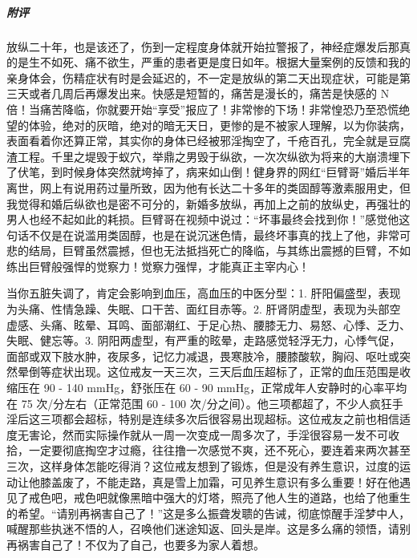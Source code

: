 \begin{case}
    \subparagraph{附评} 放纵二十年，也是该还了，伤到一定程度身体就开始拉警报了，神经症爆发后那真的是生不如死、痛不欲生，严重的患者更是度日如年。根据大量案例的反馈和我的亲身体会，伤精症状有时是会延迟的，不一定是放纵的第二天出现症状，可能是第三天或者几周后再爆发出来。快感是短暂的，痛苦是漫长的，痛苦是快感的 N 倍！当痛苦降临，你就要开始“享受”报应了！非常惨的下场！非常惶恐乃至恐慌绝望的体验，绝对的灰暗，绝对的暗无天日，更惨的是不被家人理解，以为你装病，表面看着你还算正常，其实你的身体已经被邪淫掏空了，千疮百孔，完全就是豆腐渣工程。千里之堤毁于蚁穴，举鼎之男毁于纵欲，一次次纵欲为将来的大崩溃埋下了伏笔，到时候身体突然就垮掉了，病来如山倒！健身界的网红“巨臂哥”婚后半年离世，网上有说用药过量所致，因为他有长达二十多年的类固醇等激素服用史，但我觉得和婚后纵欲也是密不可分的，新婚多放纵，再加上之前的放纵史，再强壮的男人也经不起如此的耗损。巨臂哥在视频中说过：“坏事最终会找到你！”感觉他这句话不仅是在说滥用类固醇，也是在说沉迷色情，最终坏事真的找上了他，非常可悲的结局，巨臂虽然震撼，但也无法抵挡死亡的降临，与其练出震撼的巨臂，不如练出巨臂般强悍的觉察力！觉察力强悍，才能真正主宰内心！

    当你五脏失调了，肯定会影响到血压，高血压的中医分型：1. 肝阳偏盛型，表现为头痛、性情急躁、失眠、口干苦、面红目赤等。2. 肝肾阴虚型，表现为头部空虚感、头痛、眩晕、耳鸣、面部潮红、于足心热、腰膝无力、易怒、心悸、乏力、失眠、健忘等。3. 阴阳两虚型，有严重的眩晕，走路感觉轻浮无力，心悸气促，面部或双下肢水肿，夜尿多，记忆力减退，畏寒肢冷，腰膝酸软，胸闷、呕吐或突然晕倒等症状出现。这位戒友一天三次，三天后血压超标了，正常的血压范围是收缩压在 90 - 140 \unit{\mmHg}，舒张压在 60 - 90 \unit{\mmHg}，正常成年人安静时的心率平均在 75 次/分左右（正常范围 60 - 100 次/分之间）。他三项都超了，不少人疯狂手淫后这三项都会超标，特别是连续多次后很容易出现超标。这位戒友之前也相信适度无害论，然而实际操作就从一周一次变成一周多次了，手淫很容易一发不可收拾，一定要彻底掏空才过瘾，往往撸一次感觉不爽，还不死心，要连着来两次甚至三次，这样身体怎能吃得消？这位戒友想到了锻炼，但是没有养生意识，过度的运动让他膝盖废了，不能走路，真是雪上加霜，可见养生意识有多么重要！好在他遇见了戒色吧，戒色吧就像黑暗中强大的灯塔，照亮了他人生的道路，也给了他重生的希望。“请别再祸害自己了！”这是多么振聋发聩的告诫，彻底惊醒手淫梦中人，喊醒那些执迷不悟的人，召唤他们迷途知返、回头是岸。这是多么痛的领悟，请别再祸害自己了！不仅为了自己，也要多为家人着想。
\end{case}

